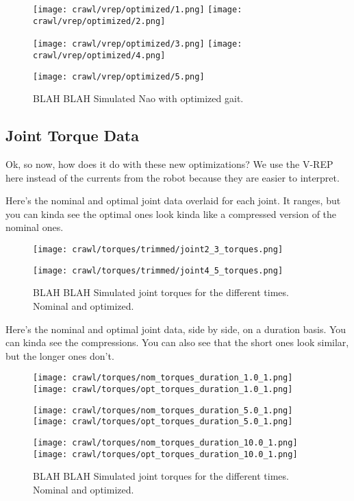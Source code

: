 \begin{figure}
  \centerline{
    \texttt{[image: crawl/vrep/optimized/1.png]}
    \texttt{[image: crawl/vrep/optimized/2.png]}
  }
  \centerline{
    \texttt{[image: crawl/vrep/optimized/3.png]}
    \texttt{[image: crawl/vrep/optimized/4.png]}
  }
  \centerline{
    \texttt{[image: crawl/vrep/optimized/5.png]}
  }
  \caption{BLAH BLAH Simulated Nao with optimized gait.}
  \label{fig:vrep_nao_opt_gait1}
\end{figure}

\subsection{Joint Torque Data} \label{subsec:opt_joint_torque_data}

Ok, so now, how does it do with these new optimizations?
We use the V-REP here instead of the currents from the robot because they are easier to interpret.

Here's the nominal and optimal joint data overlaid for each joint.
It ranges, but you can kinda see the optimal ones look kinda like a compressed version of the
nominal ones.

\begin{figure}
  \centerline{
    \texttt{[image: crawl/torques/trimmed/joint2\_3\_torques.png]}
  }
  \centerline{
    \texttt{[image: crawl/torques/trimmed/joint4\_5\_torques.png]}
  }
  \caption{BLAH BLAH Simulated joint torques for the different times. Nominal and optimized.}
  \label{fig:vrep_joint_torques_by_joint1}
\end{figure}

Here's the nominal and optimal joint data, side by side, on a duration basis.
You can kinda see the compressions. You can also see that the short ones look similar,
but the longer ones don't.

\begin{figure}
  \centerline{
    \texttt{[image: crawl/torques/nom\_torques\_duration\_1.0\_1.png]}
    \texttt{[image: crawl/torques/opt\_torques\_duration\_1.0\_1.png]}
  }
  \centerline{
    \texttt{[image: crawl/torques/nom\_torques\_duration\_5.0\_1.png]}
    \texttt{[image: crawl/torques/opt\_torques\_duration\_5.0\_1.png]}
  }
  \centerline{
    \texttt{[image: crawl/torques/nom\_torques\_duration\_10.0\_1.png]}
    \texttt{[image: crawl/torques/opt\_torques\_duration\_10.0\_1.png]}
  }
  \caption{BLAH BLAH Simulated joint torques for the different times. Nominal and optimized.}
  \label{fig:vrep_joint_torques_by_duration1}
\end{figure}

